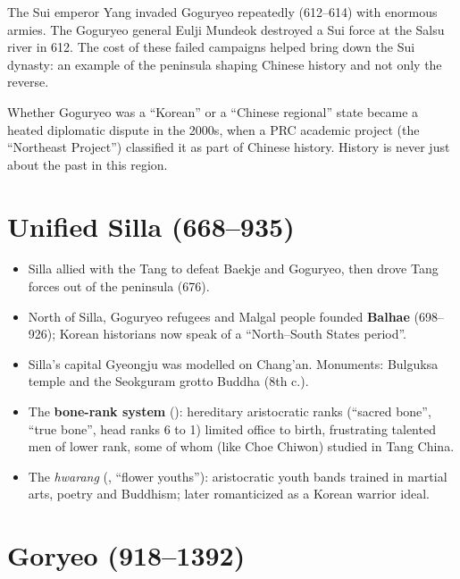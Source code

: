 \begin{example}
The Sui emperor Yang invaded Goguryeo repeatedly (612--614) with enormous armies. The
Goguryeo general Eulji Mundeok destroyed a Sui force at the Salsu river in 612. The cost of
these failed campaigns helped bring down the Sui dynasty: an example of the peninsula
shaping Chinese history and not only the reverse.
\end{example}

\begin{aside}
Whether Goguryeo was a ``Korean'' or a ``Chinese regional'' state became a heated
diplomatic dispute in the 2000s, when a PRC academic project (the ``Northeast Project'')
classified it as part of Chinese history. History is never just about the past in this
region.
\end{aside}

\section{Unified Silla (668--935)}

\begin{itemize}
  \item Silla allied with the Tang to defeat Baekje and Goguryeo, then drove Tang forces
        out of the peninsula (676).
  \item North of Silla, Goguryeo refugees and Malgal people founded \textbf{Balhae}
        (698--926); Korean historians now speak of a ``North--South States period''.
  \item Silla's capital Gyeongju was modelled on Chang'an. Monuments: Bulguksa temple and
        the Seokguram grotto Buddha (8th c.).
  \item The \textbf{bone-rank system} (): hereditary aristocratic ranks (``sacred
        bone'', ``true bone'', head ranks 6 to 1) limited office to birth, frustrating
        talented men of lower rank, some of whom (like Choe Chiwon) studied in Tang China.
  \item The \emph{hwarang} (, ``flower youths''): aristocratic youth bands trained
        in martial arts, poetry and Buddhism; later romanticized as a Korean warrior ideal.
\end{itemize}

\section{Goryeo (918--1392)}

